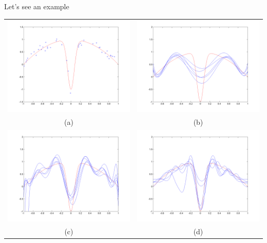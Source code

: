 \documentclass[main.tex]{subfiles}
\begin{document}
Let's see an example
\begin{center}
\begin{tabular}{cc}
  \includegraphics[width=70mm]{img/Test_function_and_noisy_data.png} &   \includegraphics[width=70mm]{img/Radial_basis_function_fit,_spread=5.png} \\
(a) & (b) \\[6pt]
 \includegraphics[width=70mm]{img/Radial_basis_function_fit,_spread=1.png} &   \includegraphics[width=70mm]{img/Radial_basis_function_fit,_spread=0.1.png} \\
(c) & (d) \\[6pt]
\end{tabular}
\end{center}
\end{document}
